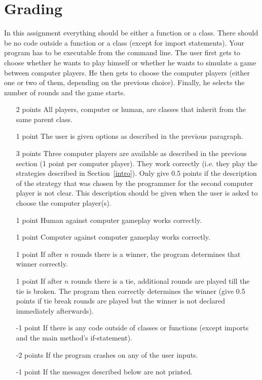 \documentclass[11pt, leqno, a4paper]{article}
\begin{document}
\section{Grading}
In this assignment everything should be either a function or a class. There should be no code outside a function or a class (except for import statements). Your
program has to be executable from the command line. The user first gets to choose whether he wants to play himself or whether he wants to simulate a game between
computer players. He then gets to choose the computer players (either one or two of them, depending on the previous choice). Finally, he selects the number of
rounds and the game starts.
\begin{itemize}
\item[2 points]	All players, computer or human, are classes that inherit from the same parent class.
\item[1 point]	The user is given options as described in the previous paragraph.
\item[3 points]	Three computer players are available as described in the previous section (1 point per computer player). They work correctly 
				(i.e. they play the strategies described in Section~\ref{intro}). Only give 0.5 points
				if the description of the strategy that was chosen by the programmer for the second computer player is not clear. This description should be given
				when the user is asked to choose the computer player(s).
\item[1 point]	Human against computer gameplay works correctly.
\item[1 point]	Computer against computer gameplay works correctly.
\item[1 point]	If after $ n $ rounds there is a winner, the program determines that winner correctly.
\item[1 point]	If after $ n $ rounds there is a tie, additional rounds are played till the tie is broken. The program then correctly determines the winner (give 0.5 
				points if tie break rounds are played but the winner is not declared immediately afterwards).
\item[-1 point]	If there is any code outside of classes or functions (except imports and the main method's if-statement).
\item[-2 points]	If the program crashes on any of the user inputs.
\item[-1 point]	If the messages described below are not printed.
\end{itemize}
\end{document}
